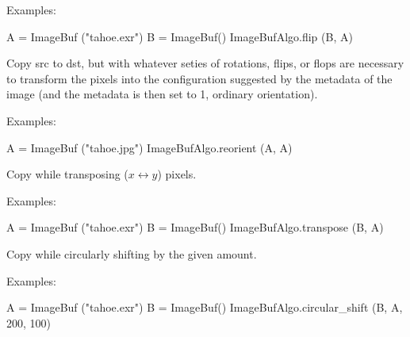 \smallskip
\noindent Examples:
\begin{code}
    A = ImageBuf ("tahoe.exr")
    B = ImageBuf()
    ImageBufAlgo.flip (B, A)
\end{code}
\apiend


 

Copy {\cf src} to {\cf dst}, but with whatever seties of rotations, flips,
or flops are necessary to transform the pixels into the configuration
suggested by the  metadata of the image (and the
 metadata is then set to 1, ordinary orientation).

\smallskip
\noindent Examples:
\begin{code}
    A = ImageBuf ("tahoe.jpg")
    ImageBufAlgo.reorient (A, A)
\end{code}
\apiend


 
Copy while transposing ($x \leftrightarrow y$) pixels.

\smallskip
\noindent Examples:
\begin{code}
    A = ImageBuf ("tahoe.exr")
    B = ImageBuf()
    ImageBufAlgo.transpose (B, A)
\end{code}
\apiend


 

Copy while circularly shifting by the given amount. 

\smallskip
\noindent Examples:
\begin{code}
    A = ImageBuf ("tahoe.exr")
    B = ImageBuf()
    ImageBufAlgo.circular_shift (B, A, 200, 100)
\end{code}
\apiend


 

